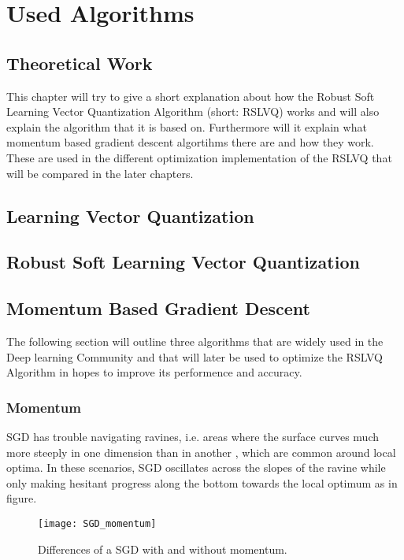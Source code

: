 \documentclass[12pt,oneside,a4paper,parskip]{scrbook}
\begin{document}
\chapter{Used Algorithms}

\section{Theoretical Work}
This chapter will try to give a short explanation about how the Robust Soft Learning Vector Quantization Algorithm 
(short: RSLVQ) works and will also explain the algorithm that it is based on. 
Furthermore will it explain what momentum based gradient descent algortihms there are and how they work.
These are used in the different optimization implementation of the RSLVQ that will be compared in the later chapters. 

\section{Learning Vector Quantization}

\section{Robust Soft Learning Vector Quantization}

\section{Momentum Based Gradient Descent}
The following section will outline three algorithms that are widely used in the Deep learning Community and that will later
be used to optimize the RSLVQ Algorithm in hopes to improve its performence and accuracy.

\subsection{Momentum}
SGD has trouble navigating ravines, i.e. areas where the surface curves much more steeply in one dimension than in another \cite{problemSteepLearn, Ruder2016AnOO},
which are common around local optima. In these scenarios, SGD oscillates across the slopes of the ravine while only making 
hesitant progress along the bottom towards the local optimum as in figure.

\begin{figure}
  \centering
  \texttt{[image: SGD\_momentum]}
  \caption[Diff. SGD moment.]{Differences of a SGD with and without momentum.\footnotemark} 
  \label{fig:SGD_momentum}
\end{figure}
\end{document}
